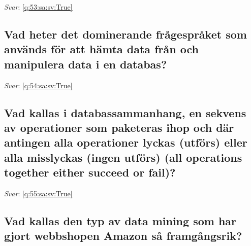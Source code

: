 \documentclass[a4paper,11pt,oneside]{article}
\begin{document}
\begin{sloppypar}
\noindent\makebox[\textwidth]{\hrulefill}

\vspace{1cm}

\textit{Svar}: \autoref{q:53:sa:sv:True}



\subsection{Vad heter det dominerande fr\r{a}gespr\r{a}ket som anv\"ands f\"or att h\"amta data fr\r{a}n och manipulera data i en databas?}

\label{q:54:sa:sv:False}

\vspace{2cm}

\noindent\makebox[\textwidth]{\hrulefill}

\vspace{1cm}

\textit{Svar}: \autoref{q:54:sa:sv:True}



\subsection{Vad kallas i databassammanhang, en sekvens av operationer som paketeras ihop och d\"ar antingen alla operationer lyckas (utf\"ors) eller alla misslyckas (ingen utf\"ors) (all operations together either succeed or fail)?}

\label{q:55:sa:sv:False}

\vspace{2cm}

\noindent\makebox[\textwidth]{\hrulefill}

\vspace{1cm}

\textit{Svar}: \autoref{q:55:sa:sv:True}



\subsection{Vad kallas den typ av data mining som har gjort webbshopen Amazon s\r{a} framg\r{a}ngsrik?}

\label{q:56:sa:sv:False}

\vspace{2cm}

\noindent\makebox[\textwidth]{\hrulefill}

\vspace{1cm}


\end{sloppypar}
\end{document}

